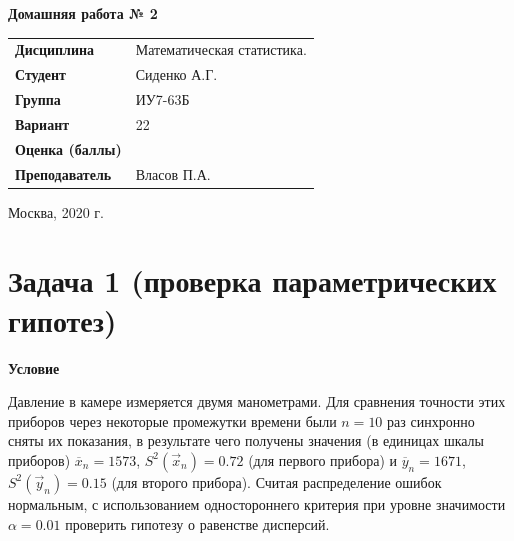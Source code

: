 \documentclass[a4paper,14pt]{extreport} %
\begin{document}
\begin{titlepage}
    \vspace{2cm}

    \begin{center}
        \textbf{Домашняя работа № 2} \\
        \vspace{0.5cm}
    \end{center}

    \vspace{5cm}

    \begin{flushleft}
        \begin{tabular}{ll}
            \textbf{Дисциплина} & Математическая статистика.  \\
            \textbf{Студент} & Сиденко А.Г. \\
            \textbf{Группа} & ИУ7-63Б \\
            \textbf{Вариант} & 22 \\
            \textbf{Оценка (баллы)} & \\
            \textbf{Преподаватель} & Власов П.А.   \\
        \end{tabular}
    \end{flushleft}

    \vspace{4cm}

   \begin{center}
        Москва, 2020 г.
    \end{center}

\end{titlepage}

\section{Задача 1 (проверка параметрических гипотез)}

\hfill

\textbf{Условие}

Давление в камере измеряется двумя манометрами. Для сравнения точности этих приборов через некоторые промежутки времени были $n = 10$ раз синхронно сняты их показания, в результате чего получены значения (в единицах шкалы приборов) $\overline x_n = 1573$, $S^2(\vec x_n) = 0.72$ (для первого прибора) и $\overline y_n = 1671$, $S^2(\vec y_n) = 0.15$ (для второго прибора). Считая распределение ошибок нормальным, с использованием одностороннего критерия при уровне значимости $\alpha = 0.01$ проверить гипотезу о равенстве дисперсий.
\end{document}
